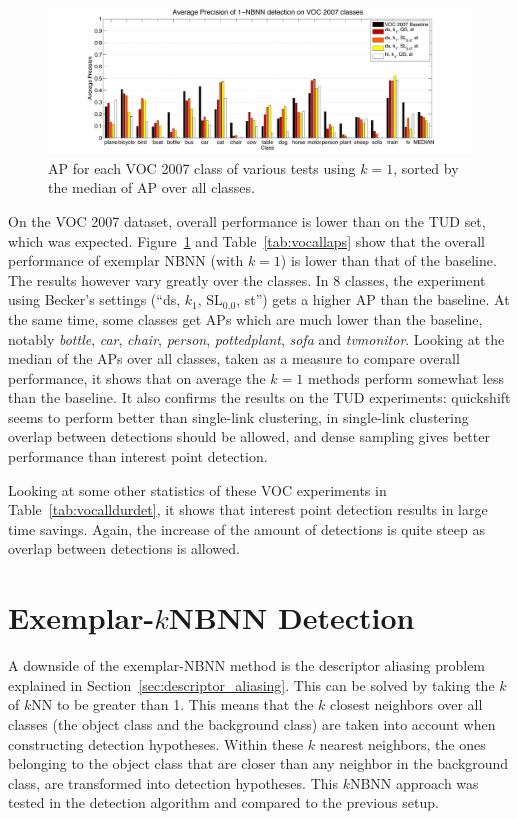 \begin{figure}[bt]
    \centering
    \includegraphics[width=\textwidth]{VOCk1ap}
    \caption{AP for each VOC 2007 class of various tests using $k=1$, sorted by the median of AP over all classes.}
    \label{fig:vock1ap}
\end{figure}

On the VOC 2007 dataset, overall performance is lower than on the TUD set, which was expected. Figure~\ref{fig:vock1ap} and Table~\ref{tab:vocallaps} show that the overall performance of exemplar NBNN (with $k=1$) is lower than that of the baseline. The results however vary greatly over the classes. In 8 classes, the experiment using Becker's settings (``ds, $k_1$, SL$_{0.0}$, st'') gets a higher AP than the baseline. At the same time, some classes get APs which are much lower than the baseline, notably \emph{bottle}, \emph{car}, \emph{chair}, \emph{person}, \emph{pottedplant}, \emph{sofa} and \emph{tvmonitor}. Looking at the median of the APs over all classes, taken as a measure to compare overall performance, it shows that on average the $k=1$ methods perform somewhat less than the baseline. It also confirms the results on the TUD experiments: quickshift seems to perform better than single-link clustering, in single-link clustering overlap between detections should be allowed, and dense sampling gives better performance than interest point detection.

Looking at some other statistics of these VOC experiments in Table~\ref{tab:vocalldurdet}, it shows that interest point detection results in large time savings. Again, the increase of the amount of detections is quite steep as overlap between detections is allowed.



\section{Exemplar-$k$NBNN Detection} %
\label{sec:local_nbnn_detection}
A downside of the exemplar-NBNN method is the descriptor aliasing problem explained in Section~\ref{sec:descriptor_aliasing}. This can be solved by taking the $k$ of $k$NN to be greater than 1. This means that the $k$ closest neighbors over all classes (the object class and the background class) are taken into account when constructing detection hypotheses. Within these $k$ nearest neighbors, the ones belonging to the object class that are closer than any neighbor in the background class, are transformed into detection hypotheses. This $k$NBNN approach was tested in the detection algorithm and compared to the previous setup. 

